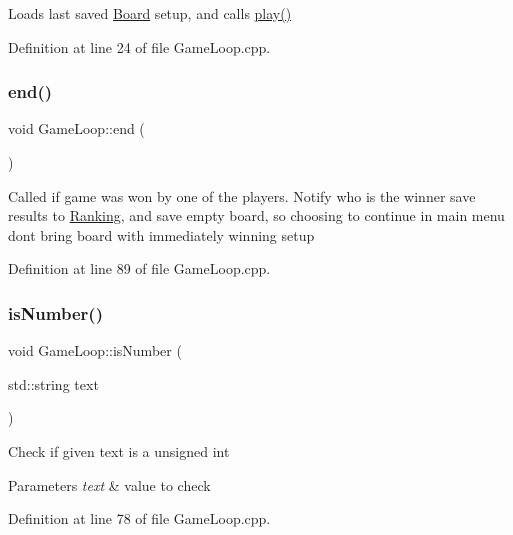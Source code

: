 Loads last saved \hyperlink{classBoard}{Board} setup, and calls \hyperlink{classGameLoop_a7e143e66d9a047a15d20c20da85f23d0}{play()} 

Definition at line 24 of file Game\+Loop.\+cpp.

\mbox{\label{classGameLoop_a30733a30b29bc93c3009b62bde59ddde}} 
\subsubsection{\texorpdfstring{end()}{end()}}
{\footnotesize\ttfamily void Game\+Loop\+::end (\begin{DoxyParamCaption}{ }\end{DoxyParamCaption})\hspace{0.3cm}{\ttfamily [private]}}

Called if game was won by one of the players. Notify who is the winner save results to \hyperlink{classRanking}{Ranking}, and save empty board, so choosing to continue in main menu don\textquotesingle{}t bring board with immediately winning setup 

Definition at line 89 of file Game\+Loop.\+cpp.

\mbox{\label{classGameLoop_aef095ed6895919ae55e260b0149ff29a}} 
\subsubsection{\texorpdfstring{is\+Number()}{isNumber()}}
{\footnotesize\ttfamily void Game\+Loop\+::is\+Number (\begin{DoxyParamCaption}\item[{std\+::string}]{text }\end{DoxyParamCaption})\hspace{0.3cm}{\ttfamily [private]}}

Check if given text is a unsigned int 
\begin{DoxyParams}{Parameters}
{\em text} & value to check \\
\hline
\end{DoxyParams}


Definition at line 78 of file Game\+Loop.\+cpp.

\mbox{\label{classGameLoop_a7e143e66d9a047a15d20c20da85f23d0}} 
